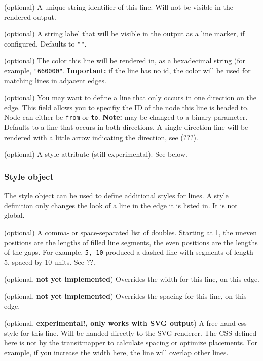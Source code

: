 \documentclass[10pt,a4paper]{article}
\begin{document}
\begin{description}[align=right]
	\item[\texttt{id}] (optional) A unique string-identifier of this line. Will not be visible in the rendered output.
	\item[\texttt{label}] (optional) A string label that will be visible in the output as a line marker, if configured. Defaults to \texttt{""}.
	\item[\texttt{color}] (optional) The color this line will be rendered in, as a hexadecimal string (for example, \texttt{"660000"}. \textbf{Important:} if the line has no id, the color will be used for matching lines in adjacent edges.
	\item[\texttt{direction}] (optional) You may want to define a line that only occurs in one direction on the edge. This field allows you to specifiy the ID of the node this line is headed to. Node can either be \texttt{from} or \texttt{to}. \textbf{Note:} may be changed to a binary parameter. Defaults to a line that occurs in both directions. A single-direction line will be rendered with a little arrow indicating the direction, see (???).
	\item[\texttt{style}] (optional) A style attribute (still experimental). See below.
\end{description}

\subsubsection{Style object}

The style object can be used to define additional styles for lines. A style definition only changes the look of a line in the edge it is listed in. It is not global.

\begin{description}[align=right]
	\item[\texttt{dash-array}] (optional) A comma- or space-separated list of doubles. Starting at 1, the uneven positions are the lengths of filled line segments, the even positions are the lengths of the gaps. For example, \texttt{5, 10} produced a dashed line with segments of length 5, spaced by 10 units. See ??.
	\item[\texttt{line-width}] (optional, \textbf{not yet implemented}) Overrides the width for this line, on this edge.
	\item[\texttt{line-spacing}] (optional, \textbf{not yet implemented}) Overrides the spacing for this line, on this edge.
	\item[\texttt{css}] (optional, \textbf{experimental!, only works with SVG output}) A free-hand css style for this line. Will be handed directly to the SVG renderer. The CSS defined here is not by the transitmapper to calculate spacing or optimize placements. For example, if you increase the width here, the line will overlap other lines.
\end{description}
\end{document}
